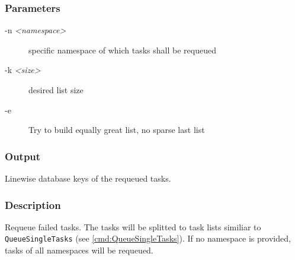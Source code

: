 \documentclass[a4paper,11pt]{article}
\begin{document}
\subsubsection{Parameters}
\begin{description}
\item[-n \textit{<namespace>}] specific namespace of which tasks shall be requeued
\item[-k \textit{<size>}] desired list size
\item[-e] Try to build equally great list, no sparse last list
\end{description}

\subsubsection{Output}
Linewise database keys of the requeued tasks.

\subsubsection{Description}
Requeue failed tasks. The tasks will be splitted to task lists similiar to \texttt{QueueSingleTasks} (see \ref{cmd:QueueSingleTasks}). If no namespace is provided, tasks of all namespaces will be requeued.

\newpage

%
%
%
%



%
%
%
%
\end{document}
